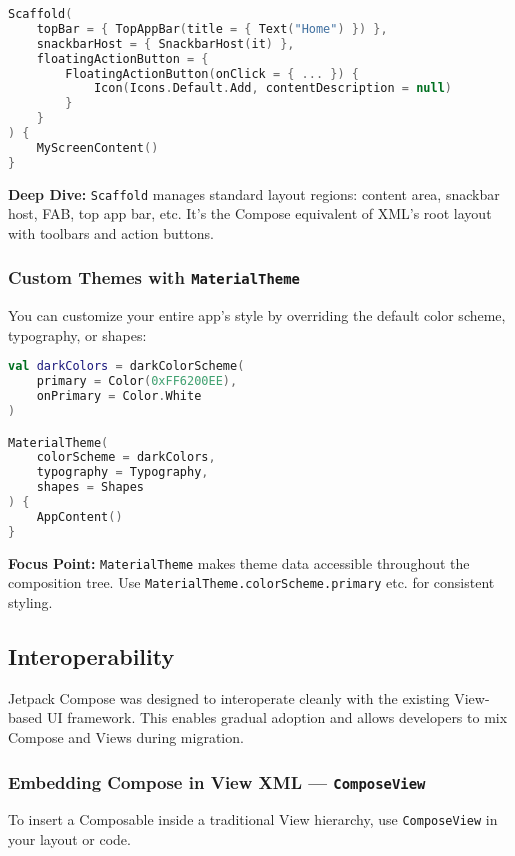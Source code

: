 \documentclass[a4paper,12pt]{article}
\begin{document}
\begin{lstlisting}[language=Kotlin]
Scaffold(
    topBar = { TopAppBar(title = { Text("Home") }) },
    snackbarHost = { SnackbarHost(it) },
    floatingActionButton = {
        FloatingActionButton(onClick = { ... }) {
            Icon(Icons.Default.Add, contentDescription = null)
        }
    }
) {
    MyScreenContent()
}
\end{lstlisting}

\textbf{Deep Dive:} \texttt{Scaffold} manages standard layout regions: content area, snackbar host, FAB, top app bar, etc. It's the Compose equivalent of XML's root layout with toolbars and action buttons.

\subsubsection{Custom Themes with \texttt{MaterialTheme}}

You can customize your entire app's style by overriding the default color scheme, typography, or shapes:

\begin{lstlisting}[language=Kotlin]
val darkColors = darkColorScheme(
    primary = Color(0xFF6200EE),
    onPrimary = Color.White
)

MaterialTheme(
    colorScheme = darkColors,
    typography = Typography,
    shapes = Shapes
) {
    AppContent()
}
\end{lstlisting}

\textbf{Focus Point:} \texttt{MaterialTheme} makes theme data accessible throughout the composition tree. Use \texttt{MaterialTheme.colorScheme.primary} etc. for consistent styling.

\subsection{Interoperability}

Jetpack Compose was designed to interoperate cleanly with the existing View-based UI framework. This enables gradual adoption and allows developers to mix Compose and Views during migration.

\subsubsection{Embedding Compose in View XML — \texttt{ComposeView}}

To insert a Composable inside a traditional View hierarchy, use \texttt{ComposeView} in your layout or code.
\end{document}
